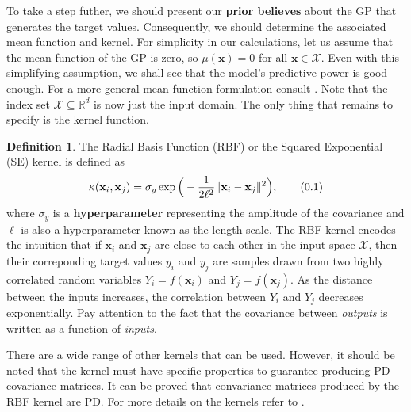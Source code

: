 \documentclass[10pt]{article}
\theoremstyle{definition}
\newtheorem{defn}{Definition}[section]
\theoremstyle{definition}
\theoremstyle{remark}
\newcommand\eqnum{\addtocounter{equation}{1}\tag{\arabic{section}.\arabic{equation}}}
\begin{document}
To take a step futher, we should present our \textbf{prior believes} about the GP that generates the target values. Consequently, we should determine the associated mean function and kernel. For simplicity in our calculations, let us assume that the mean function of the GP is zero, so $\mu(\mathbf{x})=0$ for all $\mathbf{x}\in\mathcal{X}$. Even with this simplifying assumption, we shall see that the model's predictive power is good enough. For a more general mean function formulation consult \cite[Section 2.7]{Rasmussen2006}. Note that the index set $\mathcal{X}\subseteq\mathbb{R}^d$ is now just the input domain. The only thing that remains to specify is the kernel function.
\begin{defn}
The Radial Basis Function (RBF) or the Squared Exponential (SE) kernel is defined as
\begin{equation*}
\kappa(\mathbf{x}_i,\mathbf{x}_j) = \sigma_y \exp \Big(-\frac{1}{2\ell^2} \lVert\mathbf{x}_i-\mathbf{x}_j\rVert^2\Big),
\eqnum
\label{eq:RBF}
\end{equation*}
where $\sigma_y$ is a \textbf{hyperparameter} representing the amplitude of the covariance and $\ell$ is also a hyperparameter known as the length-scale. The RBF kernel encodes the intuition that if $\mathbf{x}_i$ and $\mathbf{x}_j$ are close to each other in the input space $\mathcal{X}$, then their correponding target values $y_i$ and $y_j$ are samples drawn from two highly correlated random variables $Y_i=f(\mathbf{x}_i)$ and $Y_j=f(\mathbf{x}_j)$. As the distance between the inputs increases, the correlation between $Y_i$ and $Y_j$ decreases exponentially. Pay attention to the fact that the covariance between \textit{outputs} is written as a function of \textit{inputs}.
\end{defn}
There are a wide range of other kernels that can be used. However, it should be noted that the kernel must have specific properties to guarantee producing PD covariance matrices. It can be proved that convariance matrices produced by the RBF kernel are PD. For more details on the kernels refer to \cite[Chapter 4]{Rasmussen2006}.
\end{document}
